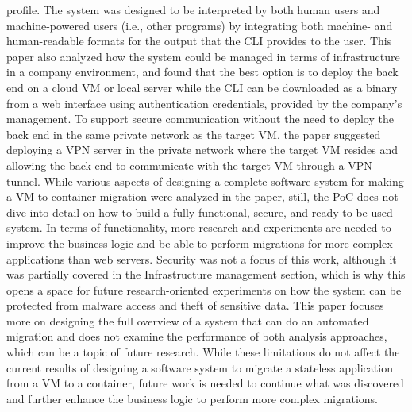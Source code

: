 \documentclass{article}
\begin{document}
\begin{multicols}{2}
profile. The system was designed to be interpreted by both human users and machine-powered users (i.e., other programs) by integrating both machine- and human-readable formats for the output that the CLI provides to the user. This paper also analyzed how the system could be managed in terms of infrastructure in a company environment, and found that the best option is to deploy the back end on a cloud VM or local server while the CLI can be downloaded as a binary from a web interface using authentication credentials, provided by the company's management. To support secure communication without the need to deploy the back end in the same private network as the target VM, the paper suggested deploying a VPN server in the private network where the target VM resides and allowing the back end to communicate with the target VM through a VPN tunnel. While various aspects of designing a complete software system for making a VM-to-container migration were analyzed in the paper, still, the PoC does not dive into detail on how to build a fully functional, secure, and ready-to-be-used system. In terms of functionality, more research and experiments are needed to improve the business logic and be able to perform migrations for more complex applications than web servers. Security was not a focus of this work, although it was partially covered in the Infrastructure management section, which is why this opens a space for future research-oriented experiments on how the system can be protected from malware access and theft of sensitive data. This paper focuses more on designing the full overview of a system that can do an automated migration and does not examine the performance of both analysis approaches, which can be a topic of future research. While these limitations do not affect the current results of designing a software system to migrate a stateless application from a VM to a container, future work is needed to continue what was discovered and further enhance the business logic to perform more complex migrations.


\end{multicols}
\end{document}
